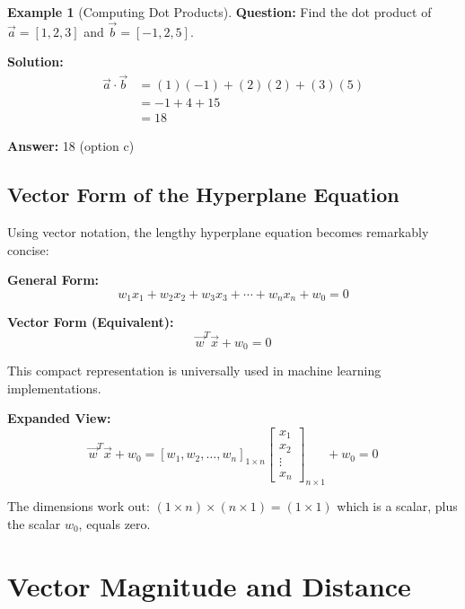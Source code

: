 \documentclass[12pt,a4paper]{article}
\theoremstyle{directpoint}
\theoremstyle{definition}
\newtheorem{example}{Example}[section]
\begin{document}
\begin{example}[Computing Dot Products]
\textbf{Question:} Find the dot product of $\vec{a} = [1, 2, 3]$ and $\vec{b} = [-1, 2, 5]$.

\textbf{Solution:}
\begin{align}
\vec{a} \cdot \vec{b} &= (1)(-1) + (2)(2) + (3)(5) \\
&= -1 + 4 + 15 \\
&= 18
\end{align}

\textbf{Answer:} 18 (option c)
\end{example}

\subsection{Vector Form of the Hyperplane Equation}

Using vector notation, the lengthy hyperplane equation becomes remarkably concise:

\begin{tcolorbox}[enhanced,breakable,colback=blue!5!white,colframe=blue!75!black,title=Vector Form of Hyperplane]
\textbf{General Form:}
\begin{equation}
w_1x_1 + w_2x_2 + w_3x_3 + \cdots + w_nx_n + w_0 = 0
\end{equation}

\textbf{Vector Form (Equivalent):}
\begin{equation}
\vec{w}^T\vec{x} + w_0 = 0
\end{equation}

This compact representation is universally used in machine learning implementations.
\end{tcolorbox}

\textbf{Expanded View:}
\begin{equation}
\vec{w}^T\vec{x} + w_0 = [w_1, w_2, \ldots, w_n]_{1 \times n} \begin{bmatrix}
x_1 \\
x_2 \\
\vdots \\
x_n
\end{bmatrix}_{n \times 1} + w_0 = 0
\end{equation}

The dimensions work out: $(1 \times n) \times (n \times 1) = (1 \times 1)$ which is a scalar, plus the scalar $w_0$, equals zero.

\newpage

\section{Vector Magnitude and Distance}
\end{document}
